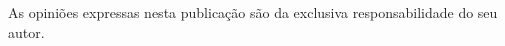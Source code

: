 \vspace*{\fill}
\normalsize{As opiniões expressas nesta publicação são da exclusiva responsabilidade do seu autor.}
\newpage